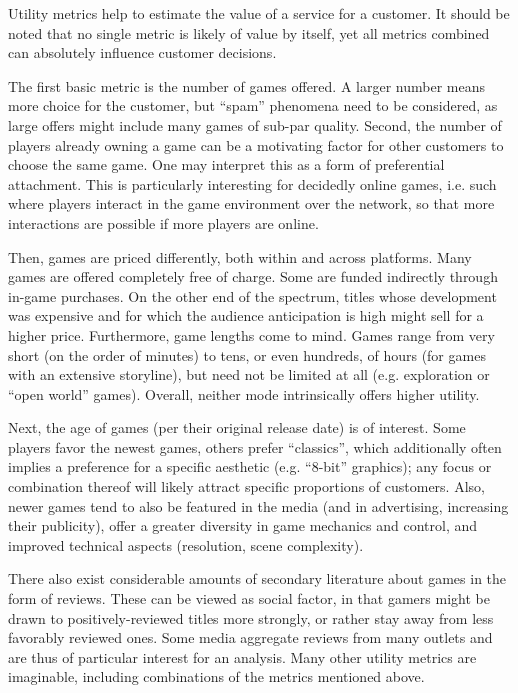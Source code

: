 Utility metrics help to estimate the value of a service for a customer.
It should be noted that no single metric is likely of value by itself,
yet all metrics combined can absolutely influence customer decisions.

The first basic metric is the number of games offered. A larger number
means more choice for the customer, but ``spam'' phenomena need to
be considered, as large offers might include many games of sub-par quality.
Second, the number of players already owning a game can be a
motivating factor for other customers to choose the same game.
One may interpret this as a form of preferential attachment.
This is particularly interesting for decidedly online games, i.e.
such where players interact in the game environment over the network,
so that more interactions are possible if more players are online.

Then, games are priced differently, both within and across
platforms. Many games are offered completely free of charge.
Some are funded indirectly through in-game purchases. On the
other end of the spectrum, titles whose development was expensive
and for which the audience anticipation is high might sell
for a higher price. Furthermore, game lengths come to mind.
Games range from very short (on the order of minutes) to tens, or even
hundreds, of hours (for games with an extensive storyline),
but need not be limited at all (e.g. exploration or ``open world'' games).
Overall, neither mode intrinsically offers higher utility.

Next, the age of games (per their original release date) is of
interest. Some players favor the newest games, others prefer ``classics'', 
which additionally often implies a preference for a specific aesthetic (e.g.
``8-bit'' graphics); any focus or combination thereof will likely attract
specific proportions of customers. Also, newer games tend to also be featured
in the media (and in advertising, increasing their publicity),
offer a greater diversity in game mechanics and control,
and improved technical aspects (resolution, scene complexity).

There also exist considerable amounts of secondary literature about
games in the form of reviews. These can be viewed as social factor,
in that gamers might be drawn to positively-reviewed titles more
strongly, or rather stay away from less favorably reviewed ones.
Some media aggregate reviews from many outlets and
are thus of particular interest for an analysis. Many other utility
metrics are imaginable, including combinations of the metrics mentioned above.

